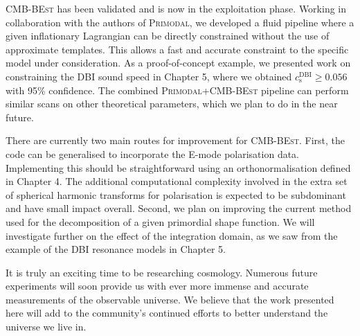 \textsc{CMB-BEst} has been validated and is now in the exploitation phase. Working in collaboration with the authors of \textsc{Primodal}, we developed a fluid pipeline where a given inflationary Lagrangian can be directly constrained without the use of approximate templates. This allows a fast and accurate constraint to the specific model under consideration. As a proof-of-concept example, we presented work on constraining the DBI sound speed in Chapter 5, where we obtained $c_\text{s}^\text{DBI} \ge 0.056$ with 95\% confidence. The combined \textsc{Primodal}+\textsc{CMB-BEst} pipeline can perform similar scans on other theoretical parameters, which we plan to do in the near future.

There are currently two main routes for improvement for \textsc{CMB-BEst}. First, the code can be generalised to incorporate the E-mode polarisation data. Implementing this should be straightforward using an orthonormalisation defined in Chapter 4. The additional computational complexity involved in the extra set of spherical harmonic transforms for polarisation is expected to be subdominant and have small impact overall. Second, we plan on improving the current method used for the decomposition of a given primordial shape function. We will investigate further on the effect of the integration domain, as we saw from the example of the DBI resonance models in Chapter 5.

It is truly an exciting time to be researching cosmology. Numerous future experiments will soon provide us with ever more immense and accurate measurements of the observable universe. We believe that the work presented here will add to the community's continued efforts to better understand the universe we live in.